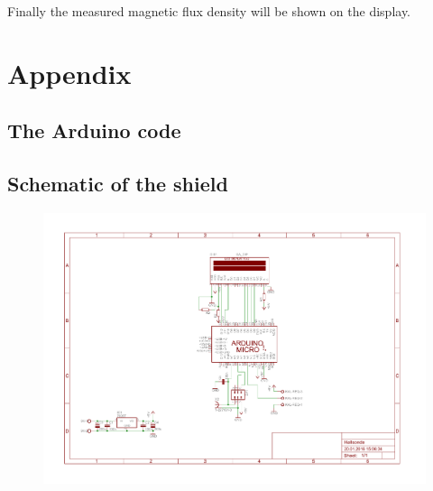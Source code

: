 \documentclass[twoside,accentcolor=tud2a,nochapname,11pt]{tudexercise}
\begin{document}
Finally the measured magnetic flux density will be shown on the display.




\newpage
\renewcommand*{\thesubsection}{\Roman{subsection}}
\section{Appendix}

\subsection{The Arduino code}
\label{app:code}
\lstset{language=C++,%
	numbers=left,%
	basicstyle=\small,%
	numberstyle=\tiny,%
	breaklines=true}



\subsection{Schematic of the shield}
\label{app:schematic}
\begin{figure}[h]%
\centering
\includegraphics[width=.75\textheight,angle=90]{../Layout/Hallsonde_Schematic}%
\end{figure}

\newpage
\end{document}

